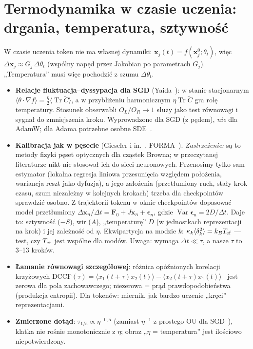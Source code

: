 \documentclass[a4paper,11pt]{article}
\begin{document}
\section{Termodynamika w czasie uczenia: drgania, temperatura, sztywność}\label{sec:termo}
W czasie uczenia token nie ma własnej dynamiki: $\bm x_j(t)=f(\bm x_j^0;\theta_t)$, więc $\Delta\bm x_j\approx G_j\,\Delta\theta_t$
(wspólny napęd przez Jakobian po parametrach $G_j$). „Temperatura” musi więc pochodzić z szumu $\Delta\theta_t$.
\begin{itemize}
\item \textbf{Relacje fluktuacja--dyssypacja dla SGD} (Yaida~\cite{yaida18}): w stanie stacjonarnym
$\langle\theta\cdot\nabla f\rangle=\tfrac{\eta}{2}\langle\operatorname{Tr}\widetilde C\rangle$, a w przybliżeniu harmonicznym
$\eta\operatorname{Tr}\widetilde C$ gra rolę temperatury. Stosunek obserwabli $O_L/O_R\to1$ służy jako test równowagi i sygnał do
zmniejszenia kroku. Wyprowadzone dla SGD (z pędem), \emph{nie} dla AdamW; dla Adama potrzebne osobne SDE~\cite{malladi22}.
\item \textbf{Kalibracja jak w pęsecie} (Gieseler i in.~\cite{gieseler20}, FORMA~\cite{garcia18}). \emph{Zastrzeżenie:} są to metody
fizyki pęset optycznych dla cząstek Browna; w przeczytanej literaturze nikt nie stosował ich do sieci neuronowych. Przenosimy tylko
sam estymator (lokalna regresja liniowa przesunięcia względem położenia, wariancja reszt jako dyfuzja), a jego założenia
(przetłumiony ruch, stały krok czasu, szum niezależny w kolejnych krokach) trzeba dla checkpointów sprawdzić osobno. Z trajektorii tokenu w
oknie checkpointów dopasować model przetłumiony $\Delta\bm x_n/\Delta t=\bm F_0+J\bm x_n+\bm\epsilon_n$, gdzie
$\operatorname{Var}\bm\epsilon_n=2D/\Delta t$. Daje to: sztywność ($-S$), wir ($A$), „temperaturę” $D$ (w jednostkach
reprezentacji na krok) i jej zależność od $\eta$. Ekwipartycja na modzie $k$: $\kappa_k\langle\delta_k^2\rangle=k_BT_{\rm ef}$ ---
test, czy $T_{\rm ef}$ jest wspólne dla modów. Uwaga: wymaga $\Delta t\ll\tau$, a nasze $\tau$ to 3--13 kroków.
\item \textbf{Łamanie równowagi szczegółowej}: różnica opóźnionych korelacji krzyżowych
$\mathrm{DCCF}(\tau)=\langle x_1(t+\tau)x_2(t)\rangle-\langle x_2(t+\tau)x_1(t)\rangle$~\cite{pesce09} jest zerowa dla pola zachowawczego;
niezerowa = prąd prawdopodobieństwa (produkcja entropii). Dla tokenów: miernik, jak bardzo uczenie „kręci” reprezentacjami.
\item \textbf{Zmierzone dotąd}: $\tau_{1/e}\propto\eta^{-0{,}5}$ (zamiast $\eta^{-1}$ z prostego OU dla SGD~\cite{pashakhanloo23}),
klatka nie rośnie monotonicznie z $\eta$; obraz „$\eta$ = temperatura” jest ilościowo niepotwierdzony.
\end{itemize}
\end{document}

